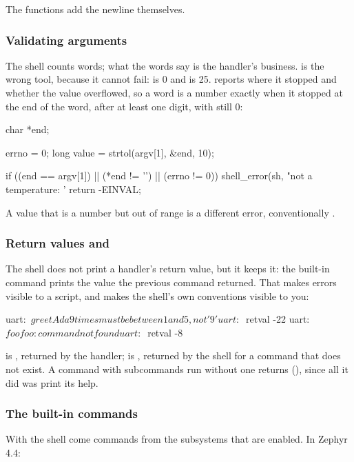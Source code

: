 The functions add the newline themselves.

\subsubsection{Validating arguments}
The shell counts words; what the words say is the handler’s business.  is the wrong
tool, because it cannot fail:  is 0 and  is 25. 
reports where it stopped and whether the value overflowed, so a word is a number exactly when it
stopped at the end of the word, after at least one digit, with  still 0:

\begin{ccode}
char *end;

errno = 0;
long value = strtol(argv[1], &end, 10);

if ((end == argv[1]) || (*end != '\0') || (errno != 0)) {
	shell_error(sh, "not a temperature: '%
	return -EINVAL;
}
\end{ccode}

A value that is a number but out of range is a different error, conventionally .

\subsubsection{Return values and }
The shell does not print a handler’s return value, but it keeps it: the built-in command
 prints the value the previous command returned. That makes errors visible to a script,
and makes the shell’s own conventions visible to you:

\begin{console}
uart:~$ greet Ada 9
times must be between 1 and 5, not '9'
uart:~$ retval
-22
uart:~$ foo
foo: command not found
uart:~$ retval
-8
\end{console}

 is , returned by the handler;  is , returned by the
shell for a command that does not exist. A command with subcommands run without one returns 
(), since all it did was print its help.

\subsubsection{The built-in commands}
With the shell come commands from the subsystems that are enabled. In Zephyr 4.4:

